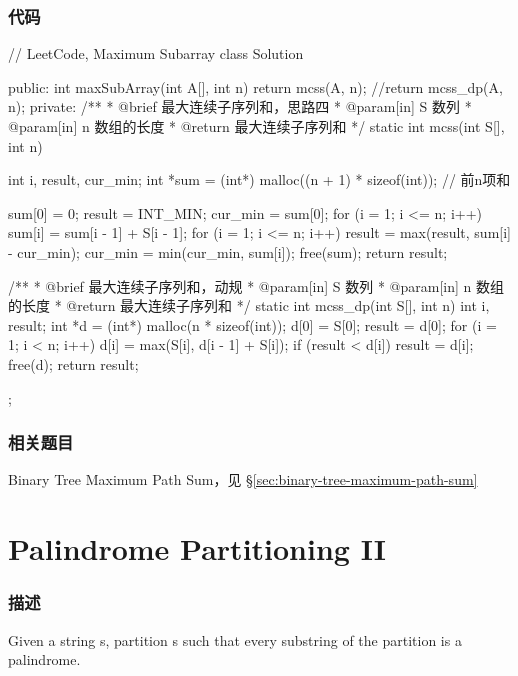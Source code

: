 \subsubsection{代码}
\begin{Code}
// LeetCode, Maximum Subarray
class Solution {
public:
    int maxSubArray(int A[], int n) {
        return mcss(A, n);
        //return mcss_dp(A, n);
    }
private:
    /**
     * @brief 最大连续子序列和，思路四
     * @param[in] S 数列
     * @param[in] n 数组的长度
     * @return 最大连续子序列和
     */
    static int mcss(int S[], int n) {
        int i, result, cur_min;
        int *sum = (int*) malloc((n + 1) * sizeof(int));  // 前n项和

        sum[0] = 0;
        result = INT_MIN;
        cur_min = sum[0];
        for (i = 1; i <= n; i++) {
            sum[i] = sum[i - 1] + S[i - 1];
        }
        for (i = 1; i <= n; i++) {
            result = max(result, sum[i] - cur_min);
            cur_min = min(cur_min, sum[i]);
        }
        free(sum);
        return result;
    }

    /**
     * @brief 最大连续子序列和，动规
     * @param[in] S 数列
     * @param[in] n 数组的长度
     * @return 最大连续子序列和
     */
    static int mcss_dp(int S[], int n) {
        int i, result;
        int *d = (int*) malloc(n * sizeof(int));
        d[0] = S[0];
        result = d[0];
        for (i = 1; i < n; i++) {
            d[i] = max(S[i], d[i - 1] + S[i]);
            if (result < d[i])
                result = d[i];
        }
        free(d);
        return result;
    }
};
\end{Code}


\subsubsection{相关题目}
\begindot
\item Binary Tree Maximum Path Sum，见 \S \ref{sec:binary-tree-maximum-path-sum}
\myenddot


\section{Palindrome Partitioning II} %
\label{sec:palindrome-partitioning-ii}


\subsubsection{描述}
Given a string s, partition s such that every substring of the partition is a palindrome.

